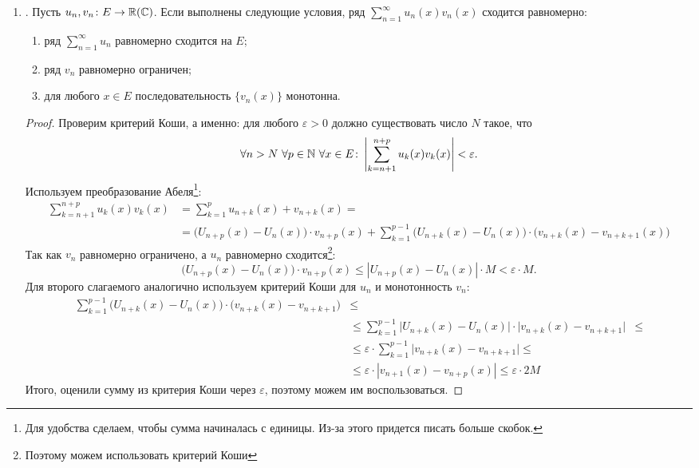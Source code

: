 \begin{prop}
\begin{enumerate}
\begin{ex}
			\end{ex}
		\item {}.  Пусть $ u_n, v_n \colon E \to \mathbb{R}(\mathbb{C})$. Если выполнены следующие условия, ряд $ \sum_{n=1}^{\infty} u_n(x)v_n(x)$ сходится равномерно:
			\begin{enumerate}[noitemsep]
				\item ряд $ \sum_{n=1}^{\infty} u_n$ равномерно сходится на $ E$;
				\item ряд $ v_n$ равномерно ограничен;
				\item для любого $ x \in E$ последовательность $ \{v_n(x)\}$ монотонна.
			\end{enumerate}
			\begin{proof}
				Проверим критерий Коши, а именно: для любого $ \varepsilon >0$ должно существовать число $ N$ такое, что
				\[
					\forall n > N ~ \forall p \in \mathbb{N} ~ \forall x \in E\colon \left|   \sum_{k=n+1}^{n+p} u_k(x)v_k(x)  \right| < \varepsilon
				.\]
				Используем преобразование Абеля\footnote{Для удобства сделаем, чтобы сумма начиналась с единицы. Из-за этого придется писать больше скобок.}:
				\[
					\begin{aligned}
						\sum_{k=n+1}^{n+p}u_k (x)v_k(x) &= \sum_{k=1}^{p} u_{n+k}(x) + v_{n+k}(x) =\\
														&= \bigl( U_{n+p}(x) - U_{n}(x) \bigr)\cdot  v_{n+p}(x) + \sum_{k=1}^{p-1} \bigl( U_{n+k}(x) - U_n(x) \bigr) \cdot \bigl( v_{n+k}(x)-v_{n+k+1}(x) \bigr)
					\end{aligned}
				\]
				Так как $ v_n$ равномерно ограничено, а $ u_n $ равномерно сходится\footnote{Поэтому можем использовать критерий Коши}:
				\[
					\bigl(U_{n+p}(x) - U_n(x)\bigr)\cdot v_{n+p}(x) \le \left| U_{n+p}(x) - U_n(x) \right| \cdot M < \varepsilon \cdot M
				.\]
				Для второго слагаемого аналогично используем критерий Коши для $ u_n$ и монотонность  $ v_n$:
				\[
					\begin{aligned}
						\sum_{k=1}^{p-1} \bigl(U_{n+k}(x) - U_n(x)\bigr) \cdot \bigl(v_{n+k}(x) - v_{n+k+1}\bigr) &\le \\
																												  & \le \sum_{k=1}^{p-1} \bigl|U_{n+k}(x) - U_n(x)\bigr| \cdot \bigl|v_{n+k}(x) - v_{n+k+1}\bigr| &\le \\
																												  & \le \varepsilon \cdot \sum_{k=1}^{p-1} \bigl|v_{n+k}(x) - v_{n+k+1}\bigr| \le \\
																												  & \le \varepsilon \cdot \left| v_{n+1}(x) - v_{n+p}(x) \right|  \le \varepsilon \cdot 2 M
					\end{aligned}
				\]
				Итого, оценили сумму из критерия Коши через $ \varepsilon $, поэтому можем им воспользоваться.
			\end{proof}
	\end{enumerate}
\end{prop}

